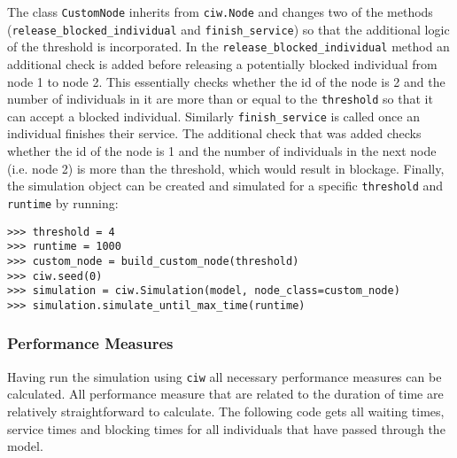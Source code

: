 The class \lstinline[style=pystyle]{CustomNode} inherits from
\lstinline[style=pystyle]{ciw.Node} and changes two of the methods
(\lstinline[style=pystyle]{release_blocked_individual} and
\lstinline[style=pystyle]{finish_service}) so that the additional logic of the
threshold is incorporated.
In the \lstinline[style=pystyle]{release_blocked_individual} method an
additional check is added before releasing a potentially blocked individual from
node 1 to node 2.
This essentially checks whether the id of the node is 2 and
the number of individuals in it are more than or equal to the
\lstinline[style=pystyle]{threshold} so that it can accept a blocked individual.
Similarly \lstinline[style=pystyle]{finish_service} is called once an individual
finishes their service.
The additional check that was added checks whether the id of the node is 1 and
the number of individuals in the next node (i.e. node 2) is more than the
threshold, which would result in blockage.
Finally, the simulation object can be created and simulated for a specific
\lstinline[style=pystyle]{threshold} and \lstinline[style=pystyle]{runtime} by
running:

\begin{lstlisting}[style=pystyle]
>>> threshold = 4
>>> runtime = 1000
>>> custom_node = build_custom_node(threshold)
>>> ciw.seed(0)
>>> simulation = ciw.Simulation(model, node_class=custom_node)
>>> simulation.simulate_until_max_time(runtime)

\end{lstlisting}


\subsubsection{Performance Measures}

Having run the simulation using \lstinline[style=pystyle]{ciw} all necessary
performance measures can be calculated.
All performance measure that are related to the duration of time are relatively
straightforward to calculate.
The following code gets all waiting times, service times and blocking times for
all individuals that have passed through the model.


